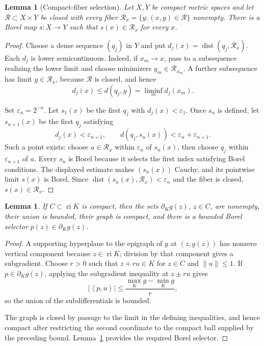 \documentclass[11pt,a4paper]{amsart}
\newtheorem{lemma}[theorem]{Lemma}
\theoremstyle{remark}
\newcommand{\ri}{\operatorname{ri}}
\newcommand{\inner}[2]{\left\langle #1,#2\right\rangle}
\begin{document}
\begin{lemma}[Compact-fiber selection]\label{lem:borel-selection}
Let \(X,Y\) be compact metric spaces and let
\(\mathcal R\subset X\times Y\) be closed with every fiber
\(\mathcal R_x=\{y:(x,y)\in\mathcal R\}\) nonempty.  There is a Borel map
\(s\colon X\to Y\) such that \(s(x)\in\mathcal R_x\) for every \(x\).
\end{lemma}

\begin{proof}
Choose a dense sequence \((q_j)\) in \(Y\) and put
\(d_j(x)=\operatorname{dist}(q_j,\mathcal R_x)\).  Each \(d_j\) is lower
semicontinuous.  Indeed, if \(x_m\to x\), pass to a subsequence realizing
the lower limit and choose minimizers \(y_m\in\mathcal R_{x_m}\).  A further
subsequence has limit \(y\in\mathcal R_x\), because \(\mathcal R\) is
closed, and hence
\[
 d_j(x)\leq d(q_j,y)=\liminf_m d_j(x_m).
\]

Set \(\varepsilon_n=2^{-n}\).  Let \(s_1(x)\) be the first \(q_j\) with
\(d_j(x)<\varepsilon_1\).  Once \(s_n\) is defined, let \(s_{n+1}(x)\) be
the first \(q_j\) satisfying
\[
 d_j(x)<\varepsilon_{n+1},\qquad
 d(q_j,s_n(x))<\varepsilon_n+\varepsilon_{n+1}.
\]
Such a point exists: choose \(a\in\mathcal R_x\) within
\(\varepsilon_n\) of \(s_n(x)\), then choose \(q_j\) within
\(\varepsilon_{n+1}\) of \(a\).  Every \(s_n\) is Borel because it selects
the first index satisfying Borel conditions.  The displayed estimate makes
\((s_n(x))\) Cauchy, and its pointwise limit \(s(x)\) is Borel.  Since
\(\operatorname{dist}(s_n(x),\mathcal R_x)<\varepsilon_n\) and the fiber is
closed, \(s(x)\in\mathcal R_x\).
\end{proof}

\begin{lemma}\label{lem:selector}
If \(C\subset\ri K\) is compact, then the sets
\(\partial_Kg(z)\), \(z\in C\), are nonempty, their union is bounded, their
graph is compact, and there is a bounded Borel selector
\(p(z)\in\partial_Kg(z)\).
\end{lemma}

\begin{proof}
A supporting hyperplane to the epigraph of \(g\) at \((z,g(z))\) has
nonzero vertical component because \(z\in\ri K\); division by that component
gives a subgradient.  Choose \(r>0\) such that
\(z+ru\in K\) for \(z\in C\) and \(\|u\|\leq1\).  If
\(p\in\partial_Kg(z)\), applying the subgradient inequality at \(z\pm ru\)
gives
\[
 |\inner{p}{u}|\leq
 \frac{\max_Kg-\min_Kg}{r},
\]
so the union of the subdifferentials is bounded.

The graph is closed by passage to the limit in the defining inequalities,
and hence compact after restricting the second coordinate to the compact
ball supplied by the preceding bound.  Lemma~\ref{lem:borel-selection}
provides the required Borel selector.
\end{proof}
\end{document}
